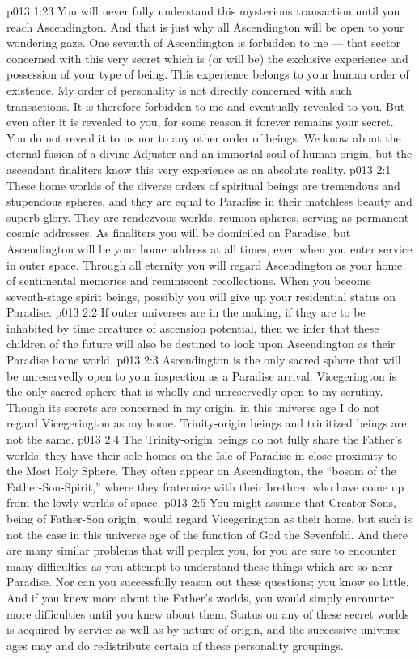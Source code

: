 \vs p013 1:23 You will never fully understand this mysterious transaction until you reach Ascendington. And that is just why all Ascendington will be open to your wondering gaze. One seventh of Ascendington is forbidden to me --- that sector concerned with this very secret which is (or will be) the exclusive experience and possession of your type of being. This experience belongs to your human order of existence. My order of personality is not directly concerned with such transactions. It is therefore forbidden to me and eventually revealed to you. But even after it is revealed to you, for some reason it forever remains your secret. You do not reveal it to us nor to any other order of beings. We know about the eternal fusion of a divine Adjuster and an immortal soul of human origin, but the ascendant finaliters know this very experience as an absolute reality.
\vs p013 2:1 These home worlds of the diverse orders of spiritual beings are tremendous and stupendous spheres, and they are equal to Paradise in their matchless beauty and superb glory. They are rendezvous worlds, reunion spheres, serving as permanent cosmic addresses. As finaliters you will be domiciled on Paradise, but Ascendington will be your home address at all times, even when you enter service in outer space. Through all eternity you will regard Ascendington as your home of sentimental memories and reminiscent recollections. When you become seventh\hyp{}stage spirit beings, possibly you will give up your residential status on Paradise.
\vs p013 2:2 If outer universes are in the making, if they are to be inhabited by time creatures of ascension potential, then we infer that these children of the future will also be destined to look upon Ascendington as their Paradise home world.
\vs p013 2:3 \pc Ascendington is the only sacred sphere that will be unreservedly open to your inspection as a Paradise arrival. Vicegerington is the only sacred sphere that is wholly and unreservedly open to my scrutiny. Though its secrets are concerned in my origin, in this universe age I do not regard Vicegerington as my home. Trinity\hyp{}origin beings and trinitized beings are not the same.
\vs p013 2:4 \pc The Trinity\hyp{}origin beings do not fully share the Father’s worlds; they have their sole homes on the Isle of Paradise in close proximity to the Most Holy Sphere. They often appear on Ascendington, the “bosom of the Father\hyp{}Son\hyp{}Spirit,” where they fraternize with their brethren who have come up from the lowly worlds of space.
\vs p013 2:5 \pc You might assume that Creator Sons, being of Father\hyp{}Son origin, would regard Vicegerington as their home, but such is not the case in this universe age of the function of God the Sevenfold. And there are many similar problems that will perplex you, for you are sure to encounter many difficulties as you attempt to understand these things which are so near Paradise. Nor can you successfully reason out these questions; you know so little. And if you knew more about the Father’s worlds, you would simply encounter more difficulties until you knew  about them. Status on any of these secret worlds is acquired by service as well as by nature of origin, and the successive universe ages may and do redistribute certain of these personality groupings.
